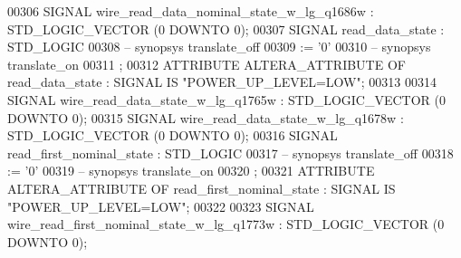 \begin{DoxyCode}
{00306      \textcolor{keywordflow}{SIGNAL}  \textcolor{vhdlchar}{wire_read_data_nominal_state_w_lg_q1686w}   \textcolor{vhdlchar}{:}   \textcolor{comment}{STD\_LOGIC\_VECTOR} \textcolor{vhdlchar}{(}\textcolor{vhdllogic}{}\textcolor{vhdllogic}{0} \textcolor{keywordflow}{DOWNTO} \textcolor{vhdllogic}{}\textcolor{vhdllogic}{0}\textcolor{vhdlchar}{)};
00307      \textcolor{keywordflow}{SIGNAL}  \textcolor{vhdlchar}{read_data_state}    \textcolor{vhdlchar}{:}   \textcolor{comment}{STD\_LOGIC}
00308 \textcolor{keyword}{     -- synopsys translate\_off}
00309       \textcolor{vhdlchar}{:=} \textcolor{vhdlchar}{'}\textcolor{vhdllogic}{}\textcolor{vhdllogic}{0}\textcolor{vhdlchar}{'}
00310 \textcolor{keyword}{     -- synopsys translate\_on}
00311      ;
00312      \textcolor{keywordflow}{ATTRIBUTE} \textcolor{vhdlchar}{ALTERA_ATTRIBUTE} \textcolor{keywordflow}{OF} \textcolor{vhdlchar}{read_data_state} \textcolor{vhdlchar}{:} \textcolor{keywordflow}{SIGNAL} \textcolor{keywordflow}{IS} \textcolor{keyword}{"POWER\_UP\_LEVEL=LOW"};
00313 
00314      \textcolor{keywordflow}{SIGNAL}  \textcolor{vhdlchar}{wire_read_data_state_w_lg_q1765w}   \textcolor{vhdlchar}{:}   \textcolor{comment}{STD\_LOGIC\_VECTOR} \textcolor{vhdlchar}{(}\textcolor{vhdllogic}{}\textcolor{vhdllogic}{0} \textcolor{keywordflow}{DOWNTO} \textcolor{vhdllogic}{}\textcolor{vhdllogic}{0}\textcolor{vhdlchar}{)};
00315      \textcolor{keywordflow}{SIGNAL}  \textcolor{vhdlchar}{wire_read_data_state_w_lg_q1678w}   \textcolor{vhdlchar}{:}   \textcolor{comment}{STD\_LOGIC\_VECTOR} \textcolor{vhdlchar}{(}\textcolor{vhdllogic}{}\textcolor{vhdllogic}{0} \textcolor{keywordflow}{DOWNTO} \textcolor{vhdllogic}{}\textcolor{vhdllogic}{0}\textcolor{vhdlchar}{)};
00316      \textcolor{keywordflow}{SIGNAL}  \textcolor{vhdlchar}{read_first_nominal_state}   \textcolor{vhdlchar}{:}   \textcolor{comment}{STD\_LOGIC}
00317 \textcolor{keyword}{     -- synopsys translate\_off}
00318       \textcolor{vhdlchar}{:=} \textcolor{vhdlchar}{'}\textcolor{vhdllogic}{}\textcolor{vhdllogic}{0}\textcolor{vhdlchar}{'}
00319 \textcolor{keyword}{     -- synopsys translate\_on}
00320      ;
00321      \textcolor{keywordflow}{ATTRIBUTE} \textcolor{vhdlchar}{ALTERA_ATTRIBUTE} \textcolor{keywordflow}{OF} \textcolor{vhdlchar}{read_first_nominal_state} \textcolor{vhdlchar}{:} \textcolor{keywordflow}{SIGNAL} \textcolor{keywordflow}{IS} \textcolor{keyword}{"POWER\_UP\_LEVEL=LOW"};
00322 
00323      \textcolor{keywordflow}{SIGNAL}  \textcolor{vhdlchar}{wire_read_first_nominal_state_w_lg_q1773w}  \textcolor{vhdlchar}{:}   \textcolor{comment}{STD\_LOGIC\_VECTOR} \textcolor{vhdlchar}{(}\textcolor{vhdllogic}{}\textcolor{vhdllogic}{0} \textcolor{keywordflow}{DOWNTO} \textcolor{vhdllogic}{}\textcolor{vhdllogic}{0}\textcolor{vhdlchar}{)};
}
\end{DoxyCode}
